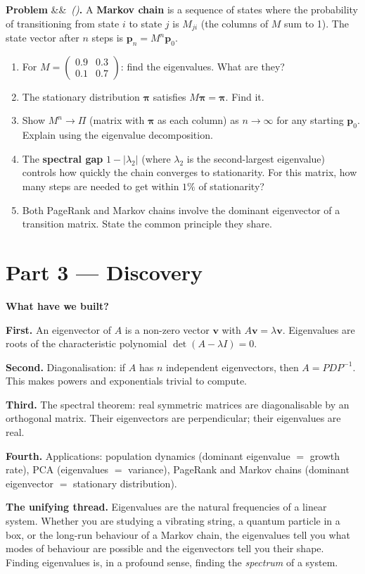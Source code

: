 \documentclass[12pt, a4paper]{article}
\newcounter{problem}
\newenvironment{problem}[1][]{\refstepcounter{problem}\par\vspace{6pt}\noindent\textbf{\color{MidBlue}Problem \theproblem}\ifx&#1&\else\ \textit{(#1)}\fi\textbf{.}\enskip}{\par\vspace{4pt}}
\begin{document}
\begin{problem}
\label{prob:markov}
A \textbf{Markov chain} is a sequence of states where the probability of transitioning from state $i$ to state $j$ is $M_{ji}$ (the columns of $M$ sum to 1). The state vector after $n$ steps is $\mathbf{p}_n = M^n\mathbf{p}_0$.
\begin{enumerate}[label=(\alph*), topsep=2pt]
  \item For $M = \begin{pmatrix}0.9&0.3\\0.1&0.7\end{pmatrix}$: find the eigenvalues. What are they?
  \item The stationary distribution $\boldsymbol{\pi}$ satisfies $M\boldsymbol{\pi} = \boldsymbol{\pi}$. Find it.
  \item Show $M^n \to \Pi$ (matrix with $\boldsymbol{\pi}$ as each column) as $n\to\infty$ for any starting $\mathbf{p}_0$. Explain using the eigenvalue decomposition.
  \item The \textbf{spectral gap} $1 - |\lambda_2|$ (where $\lambda_2$ is the second-largest eigenvalue) controls how quickly the chain converges to stationarity. For this matrix, how many steps are needed to get within $1\%$ of stationarity?
  \item Both PageRank and Markov chains involve the dominant eigenvector of a transition matrix. State the common principle they share.
\end{enumerate}
\end{problem}

\section{Part 3 \texorpdfstring{---}{--} Discovery}

\begin{discoverybox}
\textbf{What have we built?}

\textbf{First.} An eigenvector of $A$ is a non-zero vector $\mathbf{v}$ with $A\mathbf{v} = \lambda\mathbf{v}$. Eigenvalues are roots of the characteristic polynomial $\det(A-\lambda I)=0$.

\textbf{Second.} Diagonalisation: if $A$ has $n$ independent eigenvectors, then $A = PDP^{-1}$. This makes powers and exponentials trivial to compute.

\textbf{Third.} The spectral theorem: real symmetric matrices are diagonalisable by an orthogonal matrix. Their eigenvectors are perpendicular; their eigenvalues are real.

\textbf{Fourth.} Applications: population dynamics (dominant eigenvalue $=$ growth rate), PCA (eigenvalues $=$ variance), PageRank and Markov chains (dominant eigenvector $=$ stationary distribution).

\medskip
\textbf{The unifying thread.} Eigenvalues are the natural frequencies of a linear system. Whether you are studying a vibrating string, a quantum particle in a box, or the long-run behaviour of a Markov chain, the eigenvalues tell you what modes of behaviour are possible and the eigenvectors tell you their shape. Finding eigenvalues is, in a profound sense, finding the \emph{spectrum} of a system.
\end{discoverybox}
\end{document}
